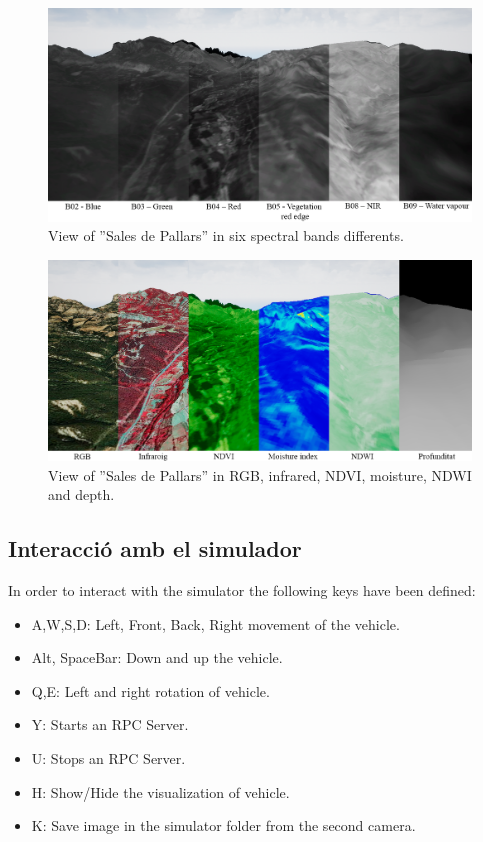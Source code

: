 \documentclass[10pt,a4paper,twocolumn,twoside]{article}
\begin{document}
\begin{figure}[!h]
\centering
  	\includegraphics[width=1\textwidth]{multispectral/bands}
	\caption{View of ''Sales de Pallars'' in six spectral bands differents.}
	\label{fig-bands}
\end{figure}

\begin{figure}[!h]
\centering
  	\includegraphics[width=1\textwidth]{multispectral/spectralindexes}
	\caption{View of ''Sales de Pallars'' in RGB, infrared, NDVI, moisture, NDWI and depth.}
	\label{fig-spectralindexes}
\end{figure}

\subsection{Interacció amb el simulador}
In order to interact with the simulator the following keys have been defined:

\begin{itemize}
\item A,W,S,D: Left, Front, Back, Right movement of the vehicle.
\item Alt, SpaceBar: Down and up the vehicle.
\item Q,E: Left and right rotation of vehicle.
\item Y: Starts an RPC Server.
\item U: Stops an RPC Server.
\item H: Show/Hide the visualization of vehicle.
\item K: Save image in the simulator folder from the second camera.
\end{itemize}
\end{document}
